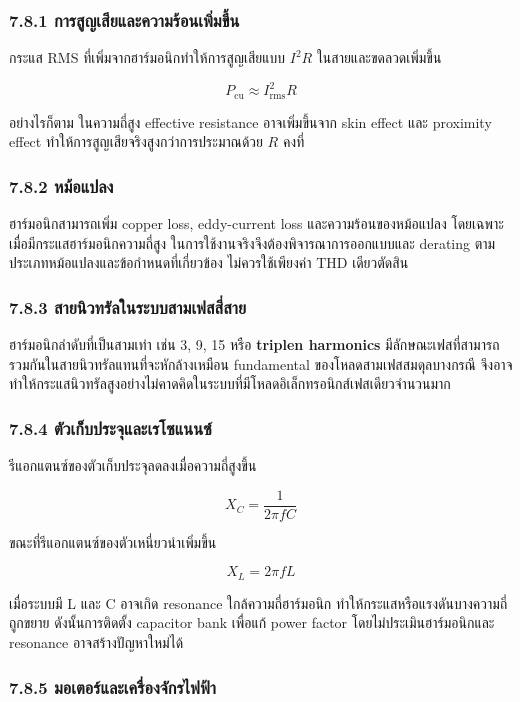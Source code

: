 \subsubsection{7.8.1 การสูญเสียและความร้อนเพิ่มขึ้น}

กระแส RMS ที่เพิ่มจากฮาร์มอนิกทำให้การสูญเสียแบบ $I^2R$ ในสายและขดลวดเพิ่มขึ้น

\[
P_{\mathrm{cu}}\approx I_{\mathrm{rms}}^2R
\]

อย่างไรก็ตาม ในความถี่สูง effective resistance อาจเพิ่มขึ้นจาก skin effect และ proximity effect ทำให้การสูญเสียจริงสูงกว่าการประมาณด้วย $R$ คงที่

\subsubsection{7.8.2 หม้อแปลง}

ฮาร์มอนิกสามารถเพิ่ม copper loss, eddy-current loss และความร้อนของหม้อแปลง โดยเฉพาะเมื่อมีกระแสฮาร์มอนิกความถี่สูง ในการใช้งานจริงจึงต้องพิจารณาการออกแบบและ derating ตามประเภทหม้อแปลงและข้อกำหนดที่เกี่ยวข้อง ไม่ควรใช้เพียงค่า THD เดียวตัดสิน

\subsubsection{7.8.3 สายนิวทรัลในระบบสามเฟสสี่สาย}

ฮาร์มอนิกลำดับที่เป็นสามเท่า เช่น 3, 9, 15 หรือ \textbf{triplen harmonics} มีลักษณะเฟสที่สามารถรวมกันในสายนิวทรัลแทนที่จะหักล้างเหมือน fundamental ของโหลดสามเฟสสมดุลบางกรณี จึงอาจทำให้กระแสนิวทรัลสูงอย่างไม่คาดคิดในระบบที่มีโหลดอิเล็กทรอนิกส์เฟสเดียวจำนวนมาก

\subsubsection{7.8.4 ตัวเก็บประจุและเรโซแนนซ์}

รีแอกแตนซ์ของตัวเก็บประจุลดลงเมื่อความถี่สูงขึ้น

\[
X_C=\frac{1}{2\pi fC}
\]

ขณะที่รีแอกแตนซ์ของตัวเหนี่ยวนำเพิ่มขึ้น

\[
X_L=2\pi fL
\]

เมื่อระบบมี L และ C อาจเกิด resonance ใกล้ความถี่ฮาร์มอนิก ทำให้กระแสหรือแรงดันบางความถี่ถูกขยาย ดังนั้นการติดตั้ง capacitor bank เพื่อแก้ power factor โดยไม่ประเมินฮาร์มอนิกและ resonance อาจสร้างปัญหาใหม่ได้

\subsubsection{7.8.5 มอเตอร์และเครื่องจักรไฟฟ้า}

